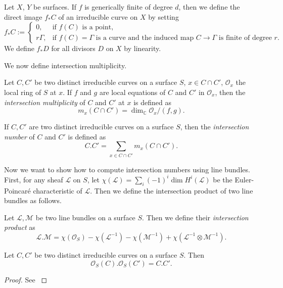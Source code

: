 Let $X$, $Y$ be surfaces. If $f$ is generically finite of degree $d$, then we define the direct image $f_*C$ of an irreducible curve on $X$ by setting 
\[
f_*C :=
\begin{cases}
0, & \text{if } f(C) \text{ is a point},\\[4pt]
r\Gamma, & \text{if } f(C)=\Gamma \text{ is a curve and the induced map } C \to \Gamma \text{ is finite of degree } r.
\end{cases}
\]
We define $f_*D$ for all divisors $D$ on $X$ by linearity.

We now define intersection multiplicity.

\begin{definition}
    Let $C, C'$ be two distinct irreducible curves on a surface $S$, $x \in C \cap C'$, $\mathcal{O}_x$ the local ring of $S$ at $x$. If $f$ and $g$ are local equations of $C$ and $C'$ in $\mathcal{O}_x$, then the \emph{intersection multiplicity} of $C$ and $C'$ at $x$ is defined as
    \[m_x(C\cap C') = \dim_\mathbb{C} \mathcal{O}_x/(f,g).\]
\end{definition}


\begin{definition}
    If $C, C'$ are two distinct irreducible curves on a surface $S$, then the \emph{intersection number} of $C$ and $C'$ is defined as
    \[C.C' = \sum_{x \in C \cap C'} m_x(C \cap C').\]
\end{definition}

Now we want to show how to compute intersection numbers using line bundles. First, for any sheaf $\mathcal{L}$ on $S$, let $\chi(\mathcal{L}) = \sum_i (-1)^i \dim H^i(\mathcal{L})$ be the Euler-Poincaré characteristic of $\mathcal{L}$. Then we define the intersection product of two line bundles as follows.

\begin{definition}
    Let $\mathcal{L}, \mathcal{M}$ be two line bundles on a surface $S$. Then we define their \emph{intersection product} as
    \[\mathcal{L}.\mathcal{M} = \chi(\mathcal{O}_S) - \chi(\mathcal{L}^{-1}) - \chi(\mathcal{M}^{-1}) + \chi(\mathcal{L}^{-1} \otimes \mathcal{M}^{-1}).\]
\end{definition}

\begin{theorem}
    Let $C, C'$ be two distinct irreducible curves on a surface $S$. Then 
    \[\mathcal{O}_S(C).\mathcal{O}_S(C') = C.C'.\]
\end{theorem}
\begin{proof}
    See \cite[Theorem I.4]{BEA96} 
\end{proof}

